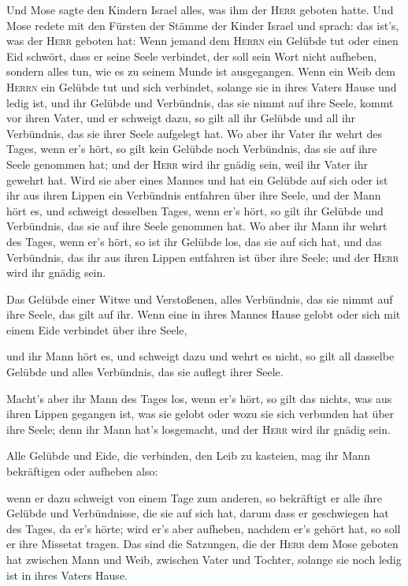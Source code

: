  Und Mose sagte den Kindern Israel alles, was ihm der
\textsc{Herr} geboten hatte.  Und Mose redete mit den
Fürsten der Stämme der Kinder Israel und sprach: das ist's, was der
\textsc{Herr} geboten hat:  Wenn jemand dem \textsc{Herrn}
ein Gelübde tut oder einen Eid schwört, dass er seine Seele verbindet,
der soll sein Wort nicht aufheben, sondern alles tun, wie es zu seinem
Munde ist ausgegangen.  Wenn ein Weib dem \textsc{Herrn}
ein Gelübde tut und sich verbindet, solange sie in ihres Vaters Hause
und ledig ist,  und ihr Gelübde und Verbündnis, das sie
nimmt auf ihre Seele, kommt vor ihren Vater, und er schweigt dazu, so
gilt all ihr Gelübde und all ihr Verbündnis, das sie ihrer Seele
aufgelegt hat.  Wo aber ihr Vater ihr wehrt des Tages,
wenn er's hört, so gilt kein Gelübde noch Verbündnis, das sie auf ihre
Seele genommen hat; und der \textsc{Herr} wird ihr gnädig sein, weil ihr
Vater ihr gewehrt hat.  Wird sie aber eines Mannes und hat
ein Gelübde auf sich oder ist ihr aus ihren Lippen ein Verbündnis
entfahren über ihre Seele,  und der Mann hört es, und
schweigt desselben Tages, wenn er's hört, so gilt ihr Gelübde und
Verbündnis, das sie auf ihre Seele genommen hat.  Wo aber
ihr Mann ihr wehrt des Tages, wenn er's hört, so ist ihr Gelübde los,
das sie auf sich hat, und das Verbündnis, das ihr aus ihren Lippen
entfahren ist über ihre Seele; und der \textsc{Herr} wird ihr gnädig
sein.

 Das Gelübde einer Witwe und Verstoßenen, alles
Verbündnis, das sie nimmt auf ihre Seele, das gilt auf ihr.
 Wenn eine in ihres Mannes Hause gelobt oder sich mit
einem Eide verbindet über ihre Seele,

 und ihr Mann hört es, und schweigt dazu und wehrt es
nicht, so gilt all dasselbe Gelübde und alles Verbündnis, das sie
auflegt ihrer Seele.

 Macht's aber ihr Mann des Tages los, wenn er's hört, so
gilt das nichts, was aus ihren Lippen gegangen ist, was sie gelobt oder
wozu sie sich verbunden hat über ihre Seele; denn ihr Mann hat's
losgemacht, und der \textsc{Herr} wird ihr gnädig sein.

 Alle Gelübde und Eide, die verbinden, den Leib zu
kasteien, mag ihr Mann bekräftigen oder aufheben also:

 wenn er dazu schweigt von einem Tage zum anderen, so
bekräftigt er alle ihre Gelübde und Verbündnisse, die sie auf sich hat,
darum dass er geschwiegen hat des Tages, da er's hörte; 
wird er's aber aufheben, nachdem er's gehört hat, so soll er ihre
Missetat tragen.  Das sind die Satzungen, die der
\textsc{Herr} dem Mose geboten hat zwischen Mann und Weib, zwischen
Vater und Tochter, solange sie noch ledig ist in ihres Vaters Hause.

